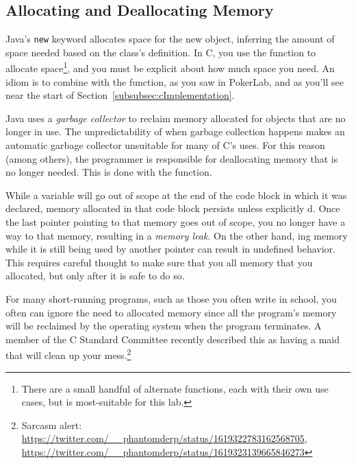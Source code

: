 \subsection{Allocating and Deallocating Memory}

Java's \lstinline{new} keyword allocates space for the new object, inferring the amount of space needed based on the class's definition.
In C, you use the  function to allocate space\footnote{
    There are a small handful of alternate functions, each with their own use cases, but  is most-suitable for this lab.
}, and you must be explicit about how much space you need.
An idiom is to combine  with the  function, as you saw in PokerLab, and as you'll see near the start of Section~\ref{subsubsec:cImplementation}.

Java uses a \textit{garbage collector} to reclaim memory allocated for objects that are no longer in use.
The unpredictability of when garbage collection happens makes an automatic garbage collector unsuitable for many of C's uses.
For this reason (among others), the programmer is responsible for deallocating memory that is no longer needed.
This is done with the  function.

While a variable will go out of scope at the end of the code block in which it was declared, memory allocated in that code block persists unless explicitly d.
Once the last pointer pointing to that memory goes out of scope, you no longer have a way to  that memory, resulting in a \textit{memory leak}.
On the other hand, ing memory while it is still being used by another pointer can result in undefined behavior.
This requires careful thought to make sure that you  all memory that you allocated, but only after it is safe to do so.

For many short-running programs, such as those you often write in school, you often can ignore the need to  allocated memory since all the program's memory will be reclaimed by the operating system when the program terminates.
A member of the C Standard Committee recently described this as having a maid that will clean up your mess.\footnote{
    Sarcasm alert: \url{https://twitter.com/__phantomderp/status/1619322783162568705}, \\ \url{https://twitter.com/__phantomderp/status/1619323139665846273}
}


